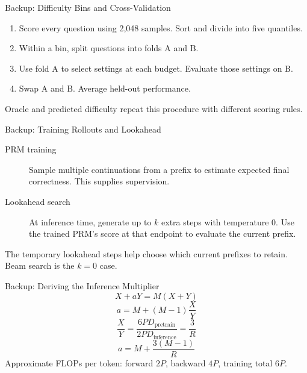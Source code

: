\documentclass[aspectratio=1610,xcolor=dvipsnames,t]{beamer}
\newcommand{\papersource}[1]{}
\begin{document}
\appendix

\begin{frame}{Backup: Difficulty Bins and Cross-Validation}
  \begin{enumerate}
    \item Score every question using 2,048 samples. Sort and divide into five quantiles.
    \item Within a bin, split questions into folds A and B.
    \item Use fold A to select settings at each budget. Evaluate those settings on B.
    \item Swap A and B. Average held-out performance.
  \end{enumerate}
  \par\medskip
  Oracle and predicted difficulty repeat this procedure with different scoring rules.
  \papersource{Section 3.2.}
\end{frame}

\begin{frame}{Backup: Training Rollouts and Lookahead}
  \begin{description}
    \item[PRM training] Sample multiple continuations from a prefix to estimate expected final correctness. This supplies supervision.
    \item[Lookahead search] At inference time, generate up to $k$ extra steps with temperature 0. Use the trained PRM's score at that endpoint to evaluate the current prefix.
  \end{description}
  \par\medskip
  The temporary lookahead steps help choose which current prefixes to retain. Beam search is the $k=0$ case.
  \papersource{Sections 5.1--5.2.}
\end{frame}

\begin{frame}{Backup: Deriving the Inference Multiplier}
  \[
    X+aY=M(X+Y)
  \]
  \[
    a=M+(M-1)\frac{X}{Y}
  \]
  \[
    \frac{X}{Y}=\frac{6PD_{\mathrm{pretrain}}}{2PD_{\mathrm{inference}}}
    =\frac{3}{R}
  \]
  \[
    \boxed{a=M+\frac{3(M-1)}{R}}
  \]
  Approximate FLOPs per token: forward $2P$, backward $4P$, training total $6P$.
  \papersource{Section 7.}
\end{frame}
\end{document}
